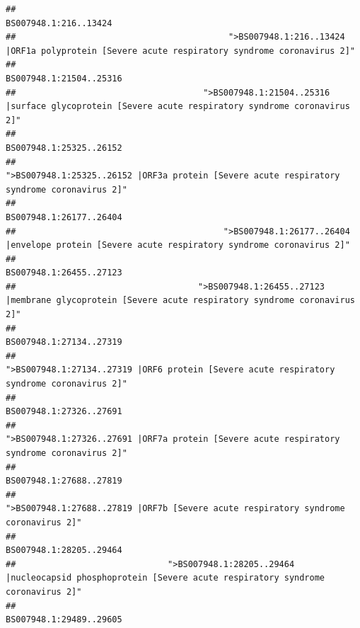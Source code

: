 \documentclass[
]{article}
\begin{document}
\begin{verbatim}
##                                                                                                                  BS007948.1:216..13424 
##                                          ">BS007948.1:216..13424 |ORF1a polyprotein [Severe acute respiratory syndrome coronavirus 2]" 
##                                                                                                                BS007948.1:21504..25316 
##                                     ">BS007948.1:21504..25316 |surface glycoprotein [Severe acute respiratory syndrome coronavirus 2]" 
##                                                                                                                BS007948.1:25325..26152 
##                                            ">BS007948.1:25325..26152 |ORF3a protein [Severe acute respiratory syndrome coronavirus 2]" 
##                                                                                                                BS007948.1:26177..26404 
##                                         ">BS007948.1:26177..26404 |envelope protein [Severe acute respiratory syndrome coronavirus 2]" 
##                                                                                                                BS007948.1:26455..27123 
##                                    ">BS007948.1:26455..27123 |membrane glycoprotein [Severe acute respiratory syndrome coronavirus 2]" 
##                                                                                                                BS007948.1:27134..27319 
##                                             ">BS007948.1:27134..27319 |ORF6 protein [Severe acute respiratory syndrome coronavirus 2]" 
##                                                                                                                BS007948.1:27326..27691 
##                                            ">BS007948.1:27326..27691 |ORF7a protein [Severe acute respiratory syndrome coronavirus 2]" 
##                                                                                                                BS007948.1:27688..27819 
##                                                    ">BS007948.1:27688..27819 |ORF7b [Severe acute respiratory syndrome coronavirus 2]" 
##                                                                                                                BS007948.1:28205..29464 
##                              ">BS007948.1:28205..29464 |nucleocapsid phosphoprotein [Severe acute respiratory syndrome coronavirus 2]" 
##                                                                                                                BS007948.1:29489..29605 

\end{verbatim}
\end{document}
